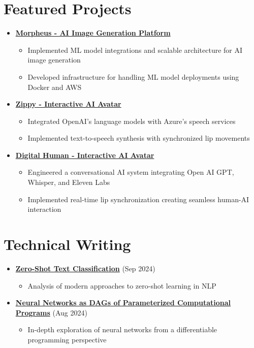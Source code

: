 \documentclass[letterpaper,11pt]{article}
\begin{document}
\section{Featured Projects}
\begin{itemize}[leftmargin=*]
    \item \textbf{\href{https://github.com/Monadical-SAS/Morpheus}{Morpheus - AI Image Generation Platform \faExternalLink}}
    \begin{itemize}
        \item Implemented ML model integrations and scalable architecture for AI image generation
        \item Developed infrastructure for handling ML model deployments using Docker and AWS
    \end{itemize}
    
    \item \textbf{\href{https://github.com/asanchezyali/ai-avatar}{Zippy - Interactive AI Avatar \faExternalLink}}
    \begin{itemize}
        \item Integrated OpenAI's language models with Azure's speech services
        \item Implemented text-to-speech synthesis with synchronized lip movements
    \end{itemize}
       \item \textbf{\href{https://github.com/asanchezyali/talking-avatar-with-ai}{Digital Human - Interactive AI Avatar \faExternalLink}}
    \begin{itemize}
        \item Engineered a conversational AI system integrating Open AI GPT, Whisper, and Eleven Labs
        \item Implemented real-time lip synchronization creating seamless human-AI interaction
    \end{itemize}
\end{itemize}

\section{Technical Writing}
\begin{itemize}[leftmargin=*]
    \item \textbf{\href{https://www.asanchezyali.com/blog/ai/20240917ZeroShot}{Zero-Shot Text Classification}} (Sep 2024)
    \begin{itemize}
        \item Analysis of modern approaches to zero-shot learning in NLP
    \end{itemize}
    
    \item \textbf{\href{https://www.asanchezyali.com/blog/differentiable-programming/20240923DifferentiablePrograms}{Neural Networks as DAGs of Parameterized Computational Programs}} (Aug 2024)
    \begin{itemize}
        \item In-depth exploration of neural networks from a differentiable programming perspective
    \end{itemize}
\end{itemize}
\end{document}
